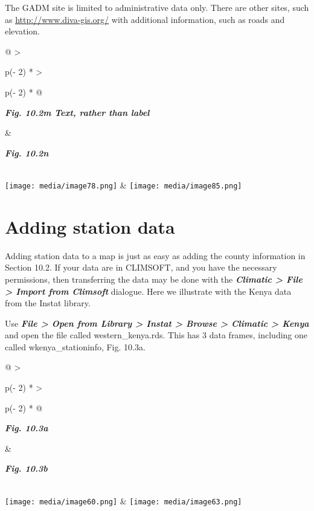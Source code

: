 \documentclass[
  letterpaper,
  DIV=11,
  numbers=noendperiod]{scrreprt}
\begin{document}
The GADM site is limited to administrative data only. There are other
sites, such as
\href{http://www.diva-gis.org/}{\ul{http://www.diva-gis.org/}} with
additional information, such as roads and elevation.

\begin{longtable}[]{@{}
  >{\raggedright\arraybackslash}p{(\columnwidth - 2\tabcolsep) * }
  >{\raggedright\arraybackslash}p{(\columnwidth - 2\tabcolsep) * }@{}}
\toprule\noalign{}
\begin{minipage}[b]{\linewidth}\raggedright
\textbf{\emph{Fig. 10.2m Text, rather than label}}
\end{minipage} & \begin{minipage}[b]{\linewidth}\raggedright
\textbf{\emph{Fig. 10.2n}}
\end{minipage} \\
\midrule\noalign{}
\endhead
\bottomrule\noalign{}
\endlastfoot
\texttt{[image: media/image78.png]} &
\texttt{[image: media/image85.png]} \\
\end{longtable}

\section{Adding station data}\label{adding-station-data}

Adding station data to a map is just as easy as adding the county
information in Section 10.2. If your data are in CLIMSOFT, and you have
the necessary permissions, then transferring the data may be done with
the \textbf{\emph{Climatic \textgreater{} File \textgreater{} Import
from Climsoft}} dialogue. Here we illustrate with the Kenya data from
the Instat library.

Use \textbf{\emph{File \textgreater{} Open from Library \textgreater{}
Instat \textgreater{} Browse \textgreater{} Climatic \textgreater{}
Kenya}} and open the file called western\_kenya.rds. This has 3 data
frames, including one called wkenya\_stationinfo, Fig. 10.3a.

\begin{longtable}[]{@{}
  >{\raggedright\arraybackslash}p{(\columnwidth - 2\tabcolsep) * }
  >{\raggedright\arraybackslash}p{(\columnwidth - 2\tabcolsep) * }@{}}
\toprule\noalign{}
\begin{minipage}[b]{\linewidth}\raggedright
\textbf{\emph{Fig. 10.3a}}
\end{minipage} & \begin{minipage}[b]{\linewidth}\raggedright
\textbf{\emph{Fig. 10.3b}}
\end{minipage} \\
\midrule\noalign{}
\endhead
\bottomrule\noalign{}
\endlastfoot
\texttt{[image: media/image60.png]} &
\texttt{[image: media/image63.png]} \\
\end{longtable}
\end{document}
